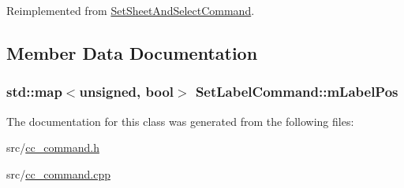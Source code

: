 Reimplemented from \hyperlink{a00132_ae017079a0a6c65222f10968fad8fc082}{Set\-Sheet\-And\-Select\-Command}.



\subsection{Member Data Documentation}
\hypertarget{a00127_ad0e6f911ca2fdc3c73909c53ce4e0313}{
\subsubsection[{m\-Label\-Pos}]{\setlength{\rightskip}{0pt plus 5cm}std\-::map$<$unsigned, bool$>$ Set\-Label\-Command\-::m\-Label\-Pos\hspace{0.3cm}{\ttfamily [protected]}}}\label{a00127_ad0e6f911ca2fdc3c73909c53ce4e0313}


The documentation for this class was generated from the following files\-:\begin{DoxyCompactItemize}
\item 
src/\hyperlink{a00183}{cc\-\_\-command.\-h}\item 
src/\hyperlink{a00182}{cc\-\_\-command.\-cpp}\end{DoxyCompactItemize}

